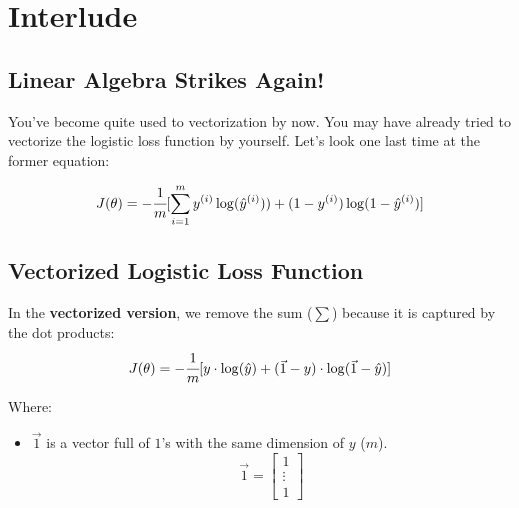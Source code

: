 
\section*{Interlude}
\subsection*{Linear Algebra Strikes Again!}

You've become quite used to vectorization by now.
You may have already tried to vectorize the logistic loss function by yourself.
Let's look one last time at the former equation:

$$
J( \theta) = -\cfrac{1} {m} \lbrack \sum_{i = 1}^{m} y^{(i)}\log(\hat{y}^{(i)})) + (1 - y^{(i)})\log(1 - \hat{y}^{(i)})\rbrack
$$

\subsection*{Vectorized Logistic Loss Function}
In the \textbf{vectorized version}, we remove the sum ($\sum$) because it is captured by the dot products:
$$
J( \theta) = -\cfrac{1} {m} \lbrack y \cdot \log(\hat{y}) + (\vec{1} - y) \cdot \log(\vec{1} - \hat{y})\rbrack
$$

Where:
\begin{itemize}
       \item $\vec{1}$ is a vector full of $1$'s with the same dimension of $y$ ($m$).
             $$
             \vec{1} = \begin{bmatrix}
                 1 \\
                 \vdots \\
                 1
             \end{bmatrix}
             $$
\end{itemize}


